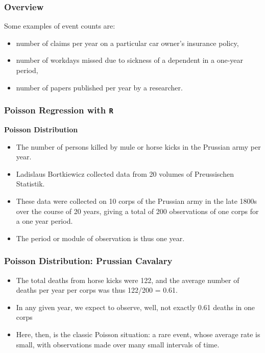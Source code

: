 \documentclass[MASTER.tex]{subfiles}
\begin{document}
\begin{frame}
	\frametitle{Overview}
	\Large Some
examples of event counts are:
\begin{itemize}
\item number of claims per year on a particular car owner’s insurance policy,
\item number of workdays missed due to sickness of a dependent in a one-year period,
\item number of papers published per year by a researcher.
\end{itemize}
\end{frame}
\begin{frame}[fragile]
	
	\frametitle{Poisson Regression with \texttt{R} } 
	\Large	
	\textbf{Poisson Distribution} 
	
	\begin{itemize}
		\item The number of persons killed by mule or horse kicks in the Prussian army per year. 
		\item Ladislaus Bortkiewicz collected data from 20 volumes of Preussischen Statistik. 
		\item These data were collected on 10 corps of the Prussian army in the late 1800s over the course of 20 years, giving a total of 200 observations of one corps for a one year period. \item The period or module of observation is thus one year. 
		
	\end{itemize}
	
\end{frame}

\begin{frame}
	\frametitle{Poisson Distribution: Prussian Cavalary}
	\Large
	\begin{itemize}
\item The total deaths from horse kicks were 122, and the average number of deaths per year per corps was thus 122/200 = 0.61. 
\item In any given year, we expect to observe, well, not exactly 0.61 deaths in one corps 
\item Here, then, is the classic Poisson situation: a rare event, whose average rate is small, with observations made over many small intervals of time.
\end{itemize}
\end{frame}
\end{document}
